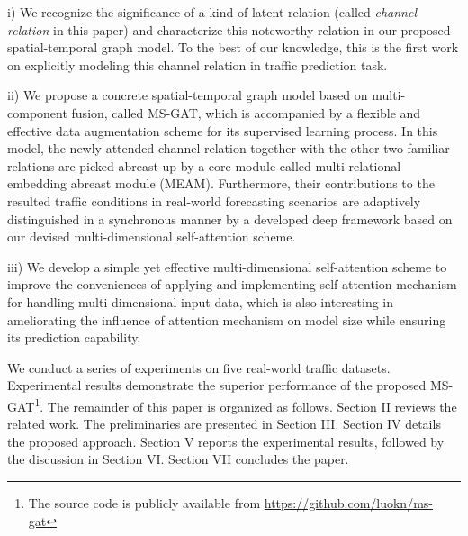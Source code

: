 i) We recognize the significance of a kind of latent relation (called \textit{channel relation} in this paper) and characterize this noteworthy relation in our proposed spatial-temporal graph model. To the best of our knowledge, this is the first work on explicitly modeling this channel relation in traffic prediction task.

ii) We propose a concrete spatial-temporal graph model based on multi-component fusion, called MS-GAT, which is accompanied by a flexible and effective data augmentation scheme for its supervised learning process. In this model, the newly-attended channel relation together with the other two familiar relations are picked abreast up by a core module called multi-relational embedding abreast module (MEAM). Furthermore, their contributions to the resulted traffic conditions in real-world forecasting scenarios are adaptively distinguished in a synchronous manner by a developed deep framework based on our devised multi-dimensional self-attention scheme.

iii) We develop a simple yet effective multi-dimensional self-attention scheme to improve the conveniences of applying and implementing self-attention mechanism for handling multi-dimensional input data, which is also interesting in ameliorating the influence of attention mechanism on model size while ensuring its prediction capability.

We conduct a series of experiments on five real-world traffic datasets. Experimental results demonstrate the superior performance of the proposed MS-GAT\footnote{The source code is publicly available from \url{https://github.com/luokn/ms-gat}}.
The remainder of this paper is organized as follows. Section II reviews the related work. The preliminaries are presented in Section III. Section IV details the proposed approach. Section V reports the experimental results, followed by the discussion in Section VI. Section VII concludes the paper.

